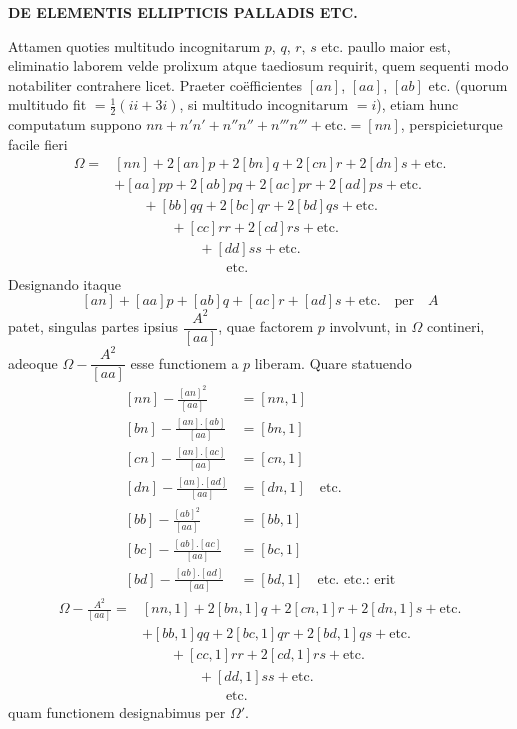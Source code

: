 \par\clearpage
\noindent{}%
\makebox[12mm][l]{}%
\parbox[t]{\dimexpr\linewidth-24mm\relax}{\centering\fontsize{7.4}{9.2}\selectfont\bfseries DE ELEMENTIS ELLIPTICIS PALLADIS ETC.\par}%
\par\nobreak\smallskip
\begingroup
\fontsize{9.65}{11.2}\selectfont
\setlength{\jot}{1.15pt}
\setlength{\abovedisplayskip}{3.8pt}
\setlength{\belowdisplayskip}{3.8pt}
\setlength{\abovedisplayshortskip}{3.8pt}
\setlength{\belowdisplayshortskip}{3.8pt}
\noindent Attamen quoties multitudo incognitarum $p$, $q$, $r$, $s$ etc. paullo maior est, eliminatio laborem velde prolixum atque taediosum requirit, quem sequenti modo notabiliter contrahere licet. Praeter coëfficientes $[an]$, $[aa]$, $[ab]$ etc. (quorum multitudo fit $=\tfrac12(ii+3i)$, si multitudo incognitarum $=i$), etiam hunc computatum suppono $nn+n'n'+n''n''+n'''n'''+\text{etc.}=[nn]$, perspicieturque facile fieri
\[
\begin{aligned}
\Omega={}&[nn]+2[an]p+2[bn]q+2[cn]r+2[dn]s+\text{etc.}\\
&+[aa]pp+2[ab]pq+2[ac]pr+2[ad]ps+\text{etc.}\\
&\qquad+[bb]qq+2[bc]qr+2[bd]qs+\text{etc.}\\
&\qquad\qquad+[cc]rr+2[cd]rs+\text{etc.}\\
&\qquad\qquad\qquad+[dd]ss+\text{etc.}\\
&\qquad\qquad\qquad\qquad\text{etc.}
\end{aligned}
\]
Designando itaque
\[
{[an]}+[aa]p+[ab]q+[ac]r+[ad]s+\text{etc.}\quad\text{per}\quad A
\]
patet, singulas partes ipsius $\dfrac{A^2}{[aa]}$, quae factorem $p$ involvunt, in $\Omega$ contineri, adeoque $\Omega-\dfrac{A^2}{[aa]}$ esse functionem a $p$ liberam. Quare statuendo
\[
\begin{aligned}{}
{[nn]}-\frac{[an]^2}{[aa]}&=[nn,1]\\
{[bn]}-\frac{[an].[ab]}{[aa]}&=[bn,1]\\
{[cn]}-\frac{[an].[ac]}{[aa]}&=[cn,1]\\
{[dn]}-\frac{[an].[ad]}{[aa]}&=[dn,1]\quad\text{etc.}\\
{[bb]}-\frac{[ab]^2}{[aa]}&=[bb,1]\\
{[bc]}-\frac{[ab].[ac]}{[aa]}&=[bc,1]\\
{[bd]}-\frac{[ab].[ad]}{[aa]}&=[bd,1]\quad\text{etc. etc.: erit}
\end{aligned}
\]
\[
\begin{aligned}
\Omega-\frac{A^2}{[aa]}={}&[nn,1]+2[bn,1]q+2[cn,1]r+2[dn,1]s+\text{etc.}\\
&+[bb,1]qq+2[bc,1]qr+2[bd,1]qs+\text{etc.}\\
&\qquad+[cc,1]rr+2[cd,1]rs+\text{etc.}\\
&\qquad\qquad+[dd,1]ss+\text{etc.}\\
&\qquad\qquad\qquad\text{etc.}
\end{aligned}
\]
quam functionem designabimus per $\Omega'$.

